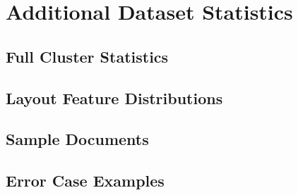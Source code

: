 \chapter{Additional Dataset Statistics}
\label{app:data}

\section{Full Cluster Statistics}
\label{app:cluster_stats}


\section{Layout Feature Distributions}
\label{app:feature_dist}


\section{Sample Documents}
\label{app:samples}


\section{Error Case Examples}
\label{app:errors}


